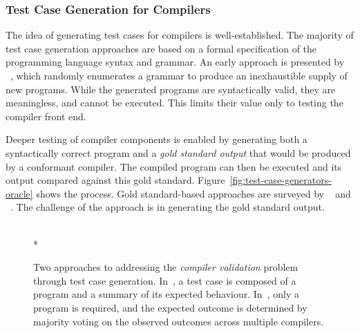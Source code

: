 \subsubsection{Test Case Generation for Compilers}

The idea of generating test cases for compilers is well-established. The majority of test case generation approaches are based on a formal specification of the programming language syntax and grammar.
An early approach is presented by \citeauthor{Hanford1970a}~\cite{Hanford1970a}, which randomly enumerates a grammar to produce an inexhaustible supply of new programs. While the generated programs are syntactically valid, they are meaningless, and cannot be executed. This limits their value only to testing the compiler front end.

Deeper testing of compiler components is enabled by generating both a syntactically correct program and a \emph{gold standard output} that would be produced by a conformant compiler. The compiled program can then be executed and its output compared against this gold standard. Figure~\ref{fig:test-case-generators-oracle} shows the process. Gold standard-based approaches are surveyed by \citeauthor{Boujarwah1997}~\cite{Boujarwah1997} and \citeauthor{Kossatchev2005}~\cite{Kossatchev2005}. The challenge of the approach is in generating the gold standard output.

\begin{figure}
  \centering
  \\*
  \caption[Generating and evaluating compiler test cases]{%
    Two approaches to addressing the \emph{compiler validation} problem through test case generation. In~\protect{}, a test case is composed of a program and a summary of its expected behaviour. In~\protect{}, only a program is required, and the expected outcome is determined by majority voting on the observed outcomes across multiple compilers.%
  }%
  \label{fig:test-case-generators}
\end{figure}

